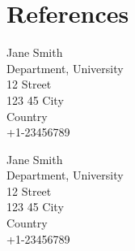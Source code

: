 \documentclass[12pt]{karencv}
\begin{document}
\section{References}
\begin{reflist}
\item Jane Smith \\
Department, University\\
12 Street \\
123 45 City\\
Country\\
+1-23456789\\
\item Jane Smith \\
Department, University\\
12 Street \\
123 45 City\\
Country\\
+1-23456789\\
\end{reflist}
\end{document}
